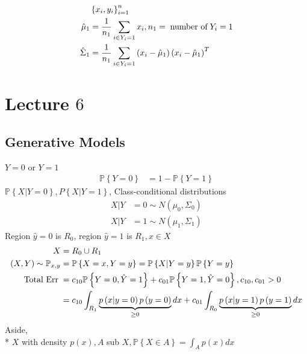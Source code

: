 \documentclass{article}
\begin{document}
\begin{align*}
&\left\{x_{i}, y_{i}\right\}_{i=1}^{n}
\\ \hat{\mu}_{1} &= \dfrac{1}{n_{1}} \displaystyle\sum_{i \in Y_{i} = 1} x_{i}, n_{1} = \text{\;number of\;} Y_{i} = 1
\\ \hat{\Sigma}_{1} &= \dfrac{1}{n_{1}} \displaystyle\sum_{i \in Y_{i} = 1} \left(x_{i} - \hat{\mu}_{1}\right) \left(x_{i} - \hat{\mu}_{1}\right)^{T}
\end{align*}





\section{Lecture $6$} 


\subsection{Generative Models}

$Y  = 0$ or $Y  = 1$
\begin{align*}
\mathbb{P}\left\{Y = 0\right\} &= 1 - \mathbb{P}\left\{Y = 1\right\}
\end{align*}
$\mathbb{P}\left\{X | Y = 0\right\}, P\left\{X | Y = 1\right\}$, Class-conditional distributions
\begin{align*}
X  | Y &= 0 \sim  N\left(\mu_{0}, \Sigma_{0}\right)
\\ X  | Y &= 1 \sim  N\left(\mu_{1}, \Sigma_{1}\right)
\end{align*}
Region $\hat{y} = 0$ is $R_{0}$, region $\hat{y} = 1$ is $R_{1}, x  \in X $
\begin{align*}
X  &= R_{0} \cup R_{1}
\\ \left(X , Y\right) \sim  \mathbb{P}_{x,y} &= \mathbb{P}\left\{X = x, Y = y\right\} = \mathbb{P}\left\{X | Y = y\right\} \mathbb{P}\left\{Y = y\right\}
\\ \text{\;Total Err\;} &= c_{10} \mathbb{P}\left\{Y = 0, \hat{Y} = 1\right\} + c_{01} \mathbb{P}\left\{Y = 1, \hat{Y} = 0\right\}, c_{10}, c_{01} > 0
\\ &= c_{10} \displaystyle\int_{R_{1}} \underbrace{p\left(x | y = 0\right) p\left(y = 0\right)}_{\geq  0} dx + c_{01} \displaystyle\int_{R_{0}} \underbrace{p\left(x | y = 1\right) p\left(y = 1\right)}_{\geq  0} dx
\end{align*}
Aside,
\\* $X $ with density $p\left(x\right) , A $ sub $X , \mathbb{P}\left\{X \in A\right\} = \displaystyle\int_{A} p\left(x\right) dx$
\end{document}
